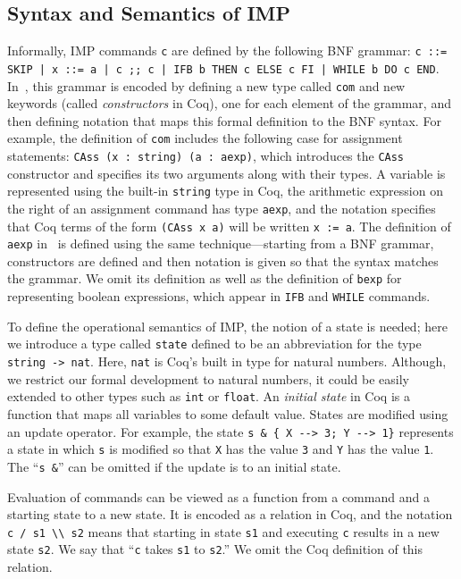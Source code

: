 \documentclass[compsoc,conference,a4paper,10pt,times]{IEEEtran}
\begin{document}
\subsection{Syntax and Semantics of IMP}
Informally, IMP commands \texttt{c} are defined by the following BNF grammar:
\texttt{c ::= SKIP | x ::= a | c ;; c | IFB b THEN c ELSE c FI | WHILE b DO c END}.
In~\cite{SFV2}, this grammar is encoded by defining a new type called \texttt{com} and new keywords (called \emph{constructors} in Coq), one for each element of the grammar, and then defining notation that maps this formal definition to the BNF syntax.  For example, the definition of \texttt{com} includes the following case for assignment statements: \texttt{CAss (x : string) (a : aexp)}, which introduces the \texttt{CAss} constructor and specifies its two arguments along with their types.  A variable is represented using the built-in \texttt{string} type in Coq, the arithmetic expression on the right of an assignment command has type \texttt{aexp}, and the notation specifies that Coq terms of the form \texttt{(CAss x a)} will be written \texttt{x := a}.
The definition of \texttt{aexp} in~\cite{SFV2} is defined using the same technique---starting from a BNF grammar, constructors are defined and then notation is given so that the syntax matches the grammar.  We omit its definition as well as the definition of \texttt{bexp} for representing boolean expressions, which appear in \texttt{IFB} and \texttt{WHILE} commands.

To define the operational semantics of IMP, the notion of a state is needed; here we introduce a type called \texttt{state} defined to be an abbreviation for the type \texttt{string -> nat}.  Here, \texttt{nat} is Coq's built in type for natural numbers.  Although, we restrict our formal development to natural numbers, it could be easily extended to other types such as \texttt{int} or \texttt{float}.  An \textit{initial state} in Coq is a function that maps all variables to some default value.  States are modified using an update operator.  For example, the state \verb|s & { X --> 3; Y --> 1}| represents a state in which \texttt{s} is modified so that \texttt{X} has the value \texttt{3} and \texttt{Y} has the value \texttt{1}.  The ``\verb|s &|'' can be omitted if the update is to an initial state.

Evaluation of commands can be viewed as a function from a command and a starting state to a new state.  It is encoded as a relation in Coq, and the notation \verb|c / s1 \\ s2| means that starting in state \texttt{s1} and executing \texttt{c} results in a new state \texttt{s2}.  We say that ``\texttt{c} takes \texttt{s1} to \texttt{s2}.''
We omit the Coq definition of this relation.
\end{document}
